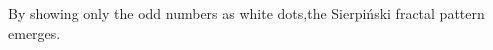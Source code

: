 \documentclass[preview]{standalone}
\begin{document}
\begin{center}
By showing only the odd numbers as white dots,the Sierpiński fractal pattern emerges.
\end{center}
\end{document}
